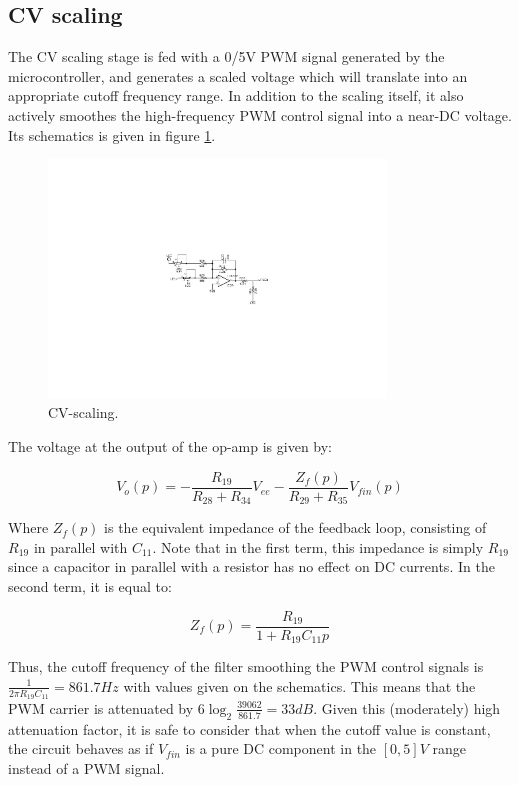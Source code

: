 \documentclass[a4paper,11pt]{article}
\begin{document}
\subsection{CV scaling}

The CV scaling stage is fed with a 0/5V PWM signal generated by the microcontroller, and generates a scaled voltage which will translate into an appropriate cutoff frequency range. In addition to the scaling itself, it also actively smoothes the high-frequency PWM control signal into a near-DC voltage. Its schematics is given in figure \ref{fig:cvscale}.

\begin{figure}
\centering
\includegraphics[width=0.8\textwidth]{smr4_scaling.pdf}
\caption{CV-scaling.}
\label{fig:cvscale}
\end{figure}

The voltage at the output of the op-amp is given by:

\begin{equation}
V_o(p) = -\frac{R_{19}}{R_{28} + R_{34}} V_{ee} -\frac{Z_f(p)}{R_{29} + R_{35}} V_{fin}(p)
\end{equation}

Where $Z_f(p)$ is the equivalent impedance of the feedback loop, consisting of $R_{19}$ in parallel with $C_{11}$. Note that in the first term, this impedance is simply $R_{19}$ since a capacitor in parallel with a resistor has no effect on DC currents. In the second term, it is equal to:

\begin{equation}
Z_f(p) = \frac{R_{19}}{1 + R_{19}C_{11}p}
\end{equation}

Thus, the cutoff frequency of the filter smoothing the PWM control signals is $\frac{1}{2 \pi R_{19}C_{11}} = 861.7 Hz$ with values given on the schematics. This means that the PWM carrier is attenuated by $6\log_2 \frac{39062}{861.7} = 33dB$. Given this (moderately) high attenuation factor, it is safe to consider that when the cutoff value is constant, the circuit behaves as if $V_{fin}$ is a pure DC component in the $[0, 5]V$ range instead of a PWM signal.
\end{document}
